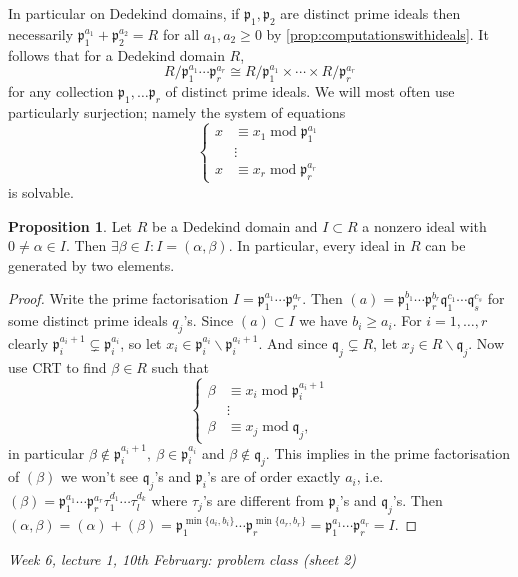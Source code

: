\documentclass{article}
\newcommand{\Mod}{\operatorname{mod}}
\newcommand{\ip}{\mathfrak{p}}
\newcommand{\iq}{\mathfrak{q}}
\theoremstyle{definition}
\newtheorem{prop}[defn]{Proposition}
\begin{document}
In particular on Dedekind domains, if $\ip_1,\ip_2$ are distinct prime ideals then necessarily $\ip_1^{a_1}+\ip_2^{a_2}=R$ for all $a_1,a_2\geq 0$ by \ref{prop:computationswithideals}. It follows that for a Dedekind domain $R$,
\[
R/\ip_1^{a_1}\cdots\ip_r^{a_r}\cong R/\ip_1^{a_1}\times\cdots\times R/\ip_r^{a_r}
\]
for any collection $\ip_1,\ldots\ip_r$ of distinct prime ideals. We will most often use particularly surjection; namely the system of equations
\[
\left\{
\begin{aligned}
x&\equiv x_1\Mod \ip_1^{a_1} \\
&\vdots \\
x&\equiv x_r\Mod \ip_r^{a_r}
\end{aligned}
\right.
\]
is solvable.

\begin{prop}
Let $R$ be a Dedekind domain and $I\subset R$ a nonzero ideal with $0\neq\alpha\in I$. Then $\exists\beta\in I:I=(\alpha,\beta)$. In particular, every ideal in $R$ can be generated by two elements.
\end{prop}
\begin{proof}
Write the prime factorisation $I=\ip_1^{a_1}\cdots\ip_r^{a_r}$. Then $(a)=\ip_1^{b_1}\cdots\ip_r^{b_r}\iq_1^{c_1}\cdots\iq_s^{c_s}$ for some distinct prime ideals $q_j$'s. Since $(a)\subset I$ we have $b_i\geq a_i$. For $i=1,\ldots,r$ clearly $\ip_i^{a_i+1}\subsetneq\ip_i^{a_i}$, so let $x_i\in\ip_i^{a_i}\backslash\ip_i^{a_i+1}$. And since $\iq_j\subsetneq R$, let $x_j\in R\backslash\iq_j$. Now use CRT to find $\beta\in R$ such that
\[
\left\{
\begin{aligned}
\beta&\equiv x_i\Mod \ip_i^{a_i+1} \\
&\vdots \\
\beta&\equiv x_j\Mod \iq_j,
\end{aligned}
\right.
\]
in particular $\beta\notin\ip_i^{a_i+1},\ \beta\in\ip_i^{a_i}$ and $\beta\notin\iq_j$. This implies in the prime factorisation of $(\beta)$ we won't see $\iq_j$'s and $\ip_i$'s are of order exactly $a_i$, i.e. $(\beta)=\ip_1^{a_1}\cdots\ip_r^{a_r}\tau_1^{d_1}\cdots\tau_l^{d_k}$ where $\tau_j$'s are different from $\ip_i$'s and $\iq_j$'s. Then $(\alpha,\beta)=(\alpha)+(\beta)=\ip_1^{\min\{a_i,b_i\}}\cdots\ip_r^{\min\{a_r,b_r\}}=\ip_1^{a_1}\cdots\ip_r^{a_r}=I$.
\end{proof}

\begin{flushright}
\textit{Week 6, lecture 1, 10th February: problem class (sheet 2)}
\end{flushright}
\end{document}
